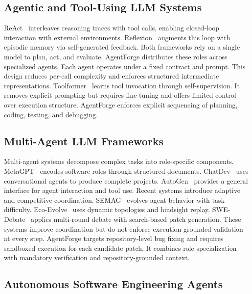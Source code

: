 \documentclass[journal]{IEEEtran}
\begin{document}
\subsection{Agentic and Tool-Using LLM Systems}

ReAct~\cite{yao2023react} interleaves reasoning traces with tool calls, enabling closed-loop interaction with external environments. Reflexion~\cite{shinn2023reflexion} augments this loop with episodic memory via self-generated feedback. Both frameworks rely on a single model to plan, act, and evaluate. AgentForge distributes these roles across specialized agents. Each agent operates under a fixed contract and prompt. This design reduces per-call complexity and enforces structured intermediate representations. Toolformer~\cite{schick2023toolformer} learns tool invocation through self-supervision. It removes explicit prompting but requires fine-tuning and offers limited control over execution structure. AgentForge enforces explicit sequencing of planning, coding, testing, and debugging.

\subsection{Multi-Agent LLM Frameworks}

Multi-agent systems decompose complex tasks into role-specific components. MetaGPT~\cite{hong2023metagpt} encodes software roles through structured documents. ChatDev~\cite{qian2023chatdev} uses conversational agents to produce complete projects. AutoGen~\cite{wu2023autogen} provides a general interface for agent interaction and tool use. Recent systems introduce adaptive and competitive coordination. SEMAG~\cite{semag2026} evolves agent behavior with task difficulty. Eco-Evolve~\cite{ecoevolve2026} uses dynamic topologies and hindsight replay. SWE-Debate~\cite{swedebate2026} applies multi-round debate with search-based patch generation. These systems improve coordination but do not enforce execution-grounded validation at every step. AgentForge targets repository-level bug fixing and requires sandboxed execution for each candidate patch. It combines role specialization with mandatory verification and repository-grounded context.

\subsection{Autonomous Software Engineering Agents}
\end{document}
